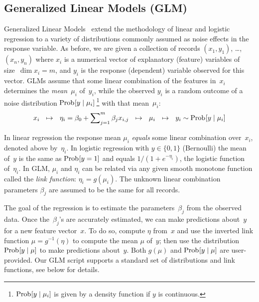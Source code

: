 \subsection{Generalized Linear Models (GLM)}

\smallskip

Generalized Linear Models~\cite{Gill2000:GLM,McCullagh1989:GLM,Nelder1972:GLM}
extend the methodology of linear and logistic regression to a variety of
distributions commonly assumed as noise effects in the response variable.
As before, we are given a collection
of records $(x_1, y_1)$, \ldots, $(x_n, y_n)$ where $x_i$ is a numerical vector of
explanatory (feature) variables of size~\mbox{$\dim x_i = m$}, and $y_i$ is the
response (dependent) variable observed for this vector.  GLMs assume that some
linear combination of the features in~$x_i$ determines the \emph{mean}~$\mu_i$
of~$y_i$, while the observed $y_i$ is a random outcome of a noise distribution
$\mathop{\mathrm{Prob}\hspace{0.5pt}}\nolimits[y\mid \mu_i]\,$\footnote{$\mathop{\mathrm{Prob}\hspace{0.5pt}}\nolimits[y\mid \mu_i]$ is given by a density function
if $y$ is continuous.}
with that mean~$\mu_i$:
\begin{equation*}
x_i \,\,\,\,\mapsto\,\,\,\, \eta_i = \beta_0 + \sum\nolimits_{j=1}^m \beta_j x_{i,j} 
\,\,\,\,\mapsto\,\,\,\, \mu_i \,\,\,\,\mapsto \,\,\,\, y_i \sim \mathop{\mathrm{Prob}\hspace{0.5pt}}\nolimits[y\mid \mu_i]
\end{equation*}

In linear regression the response mean $\mu_i$ \emph{equals} some linear combination
over~$x_i$, denoted above by~$\eta_i$.
In logistic regression with $y\in\{0, 1\}$ (Bernoulli) the mean of~$y$ is the same
as $\mathop{\mathrm{Prob}\hspace{0.5pt}}\nolimits[y=1]$ and equals $1/(1+e^{-\eta_i})$, the logistic function of~$\eta_i$.
In GLM, $\mu_i$ and $\eta_i$ can be related via any given smooth monotone function
called the \emph{link function}: $\eta_i = g(\mu_i)$.  The unknown linear combination
parameters $\beta_j$ are assumed to be the same for all records.

The goal of the regression is to estimate the parameters~$\beta_j$ from the observed
data.  Once the~$\beta_j$'s are accurately estimated, we can make predictions
about~$y$ for a new feature vector~$x$.  To do so, compute $\eta$ from~$x$ and use
the inverted link function $\mu = g^{-1}(\eta)$ to compute the mean $\mu$ of~$y$;
then use the distribution $\mathop{\mathrm{Prob}\hspace{0.5pt}}\nolimits[y\mid \mu]$ to make predictions about~$y$.
Both $g(\mu)$ and $\mathop{\mathrm{Prob}\hspace{0.5pt}}\nolimits[y\mid \mu]$ are user-provided.  Our GLM script supports
a standard set of distributions and link functions, see below for details.


